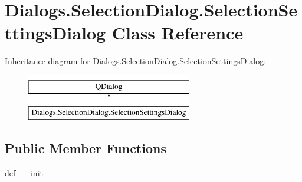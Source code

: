 \hypertarget{classDialogs_1_1SelectionDialog_1_1SelectionSettingsDialog}{\section{Dialogs.\-Selection\-Dialog.\-Selection\-Settings\-Dialog Class Reference}
\label{classDialogs_1_1SelectionDialog_1_1SelectionSettingsDialog}
}
Inheritance diagram for Dialogs.\-Selection\-Dialog.\-Selection\-Settings\-Dialog\-:\begin{figure}[H]
\begin{center}
\leavevmode
\includegraphics[height=2.000000cm]{classDialogs_1_1SelectionDialog_1_1SelectionSettingsDialog}
\end{center}
\end{figure}
\subsection*{Public Member Functions}
\begin{DoxyCompactItemize}
\item 
def \hyperlink{classDialogs_1_1SelectionDialog_1_1SelectionSettingsDialog_a4c52181a16d7934d1c1e6a3b00e066be}{\-\_\-\-\_\-init\-\_\-\-\_\-}
\end{DoxyCompactItemize}
